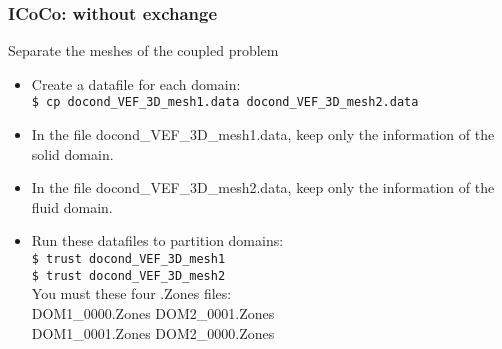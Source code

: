 \documentclass[10pt, hyperref={unicode=true,pdfusetitle, bookmarks=true,bookmarksnumbered=false,bookmarksopen=false, breaklinks=false,pdfborder={0 0 1},backref=true,colorlinks=true,linkcolor=darkblue,pageanchor, urlcolor=darkblue}]{beamer}
\begin{document}
\begin{frame}
\frametitle{ICoCo: without exchange}
\begin{block}{Separate the meshes of the coupled problem}

\begin{itemize}
\item Create a datafile for each domain:\\
\texttt{\$ cp docond\_VEF\_3D\_mesh1.data docond\_VEF\_3D\_mesh2.data }
\item In the file docond\_VEF\_3D\_mesh1.data, keep only the information of the solid domain.
\item In the file docond\_VEF\_3D\_mesh2.data, keep only the information of the fluid domain.
\item Run these datafiles to partition domains:\\
\texttt{\$ trust docond\_VEF\_3D\_mesh1 }\\
\texttt{\$ trust docond\_VEF\_3D\_mesh2 } \\
You must these four .Zones files:\\
\hspace{0.5cm} DOM1\_0000.Zones DOM2\_0001.Zones \\
\hspace{0.5cm} DOM1\_0001.Zones DOM2\_0000.Zones
\end{itemize}

\end{block}
\end{frame}
\end{document}
